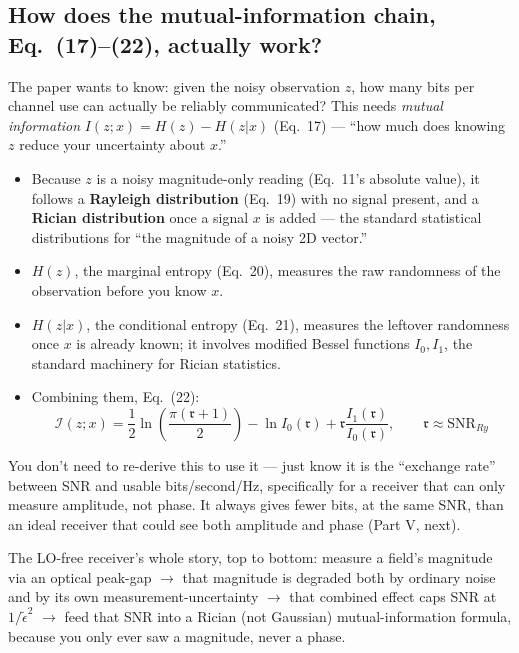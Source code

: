 \documentclass[11pt]{article}
\begin{document}
\subsection*{How does the mutual-information chain, Eq.~(17)--(22), actually work?}
The paper wants to know: given the noisy observation $z$, how many bits per channel use can actually be reliably communicated? This needs \emph{mutual information} $I(z;x)=H(z)-H(z|x)$ (Eq.~17) --- ``how much does knowing $z$ reduce your uncertainty about $x$.''
\begin{itemize}
\item Because $z$ is a noisy magnitude-only reading (Eq.~11's absolute value), it follows a \textbf{Rayleigh distribution} (Eq.~19) with no signal present, and a \textbf{Rician distribution} once a signal $x$ is added --- the standard statistical distributions for ``the magnitude of a noisy 2D vector.''
\item $H(z)$, the marginal entropy (Eq.~20), measures the raw randomness of the observation before you know $x$.
\item $H(z|x)$, the conditional entropy (Eq.~21), measures the leftover randomness once $x$ is already known; it involves modified Bessel functions $I_0,I_1$, the standard machinery for Rician statistics.
\item Combining them, Eq.~(22):
\[
\mathcal{I}(z;x)=\frac12\ln\!\left(\frac{\pi(\mathfrak r+1)}{2}\right) - \ln I_0(\mathfrak r) + \mathfrak r\frac{I_1(\mathfrak r)}{I_0(\mathfrak r)}, \qquad \mathfrak r\approx \text{SNR}_{Ry}
\]
\end{itemize}
\begin{plain}
You don't need to re-derive this to use it --- just know it is the ``exchange rate'' between SNR and usable bits/second/Hz, specifically for a receiver that can only measure amplitude, not phase. It always gives fewer bits, at the same SNR, than an ideal receiver that could see both amplitude and phase (Part V, next).
\end{plain}
\begin{takeaway}
The LO-free receiver's whole story, top to bottom: measure a field's magnitude via an optical peak-gap $\to$ that magnitude is degraded both by ordinary noise and by its own measurement-uncertainty $\to$ that combined effect caps SNR at $1/\tilde\epsilon^2$ $\to$ feed that SNR into a Rician (not Gaussian) mutual-information formula, because you only ever saw a magnitude, never a phase.
\end{takeaway}

\newpage
\end{document}
